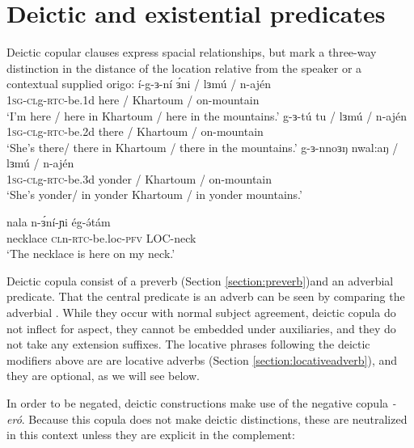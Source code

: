 \section{Deictic and existential predicates}

Deictic copular clauses express spacial relationships, but mark a three-way distinction in the distance of the location relative from the speaker or a contextual supplied origo:
\ea 
	\ea \gll   í-g-ɜ-ní 		ɜ́ni / lɜmú / n-ajén \\ 
				\textsc{1sg}-\textsc{cl}g-\textsc{rtc}-be.1d	here / Khartoum / on-mountain \\
		\glt 	`I'm here / here in Khartoum / here in the mountains.’
	\ex \gll   g-ɜ-tú 		tu / lɜmú / n-ajén \\ 
				\textsc{1sg}-\textsc{cl}g-\textsc{rtc}-be.2d	there / Khartoum / on-mountain \\
		\glt 	`She's there/ there in Khartoum / there in the mountains.’
	\ex \gll   g-ɜ-nnoɜŋ 		nwal:aŋ / lɜmú / n-ajén \\ 
				\textsc{1sg}-\textsc{cl}g-\textsc{rtc}-be.3d	yonder / Khartoum / on-mountain \\
		\glt 	`She's yonder/ in yonder Khartoum / in yonder mountains.’
\z 
\z 

\ea 	\gll nala		n-ɜ́ní-ɲi		ég-ə́tám	\\
			necklace	\textsc{cl}n-\textsc{rtc}-be.loc-\textsc{pfv} LOC-neck\\
		\glt	‘The necklace is here on my neck.’
\z %


Deictic copula consist of a preverb (Section \ref{section:preverb})and an adverbial predicate. That the central predicate is an adverb can be seen by comparing the adverbial . While they occur with normal subject agreement, deictic copula do not inflect for aspect, they cannot be embedded under auxiliaries, and they do not take any extension suffixes. The locative phrases following the deictic modifiers above are are locative adverbs (Section \ref{section:locativeadverb}), and they are optional, as we will see below.

In order to be negated, deictic constructions make use of the negative copula \textit{-eró}. Because this copula does not make deictic distinctions, these are neutralized in this context unless they are explicit in the complement:

